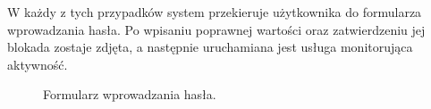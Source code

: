 W każdy z tych przypadków system przekieruje użytkownika do formularza wprowadzania hasła. Po wpisaniu poprawnej wartości oraz zatwierdzeniu jej blokada zostaje zdjęta, a następnie uruchamiana jest usługa monitorująca aktywność.
\newline\newline\newline
\begin{figure}[H]
    \begin{center}
        \setlength{\fboxsep}{0pt}%
        \setlength{\fboxrule}{0.3pt}%
    \end{center}
    \caption{{\color{dgray}Formularz wprowadzania hasła.}} \label{enterPassword}
\end{figure}
